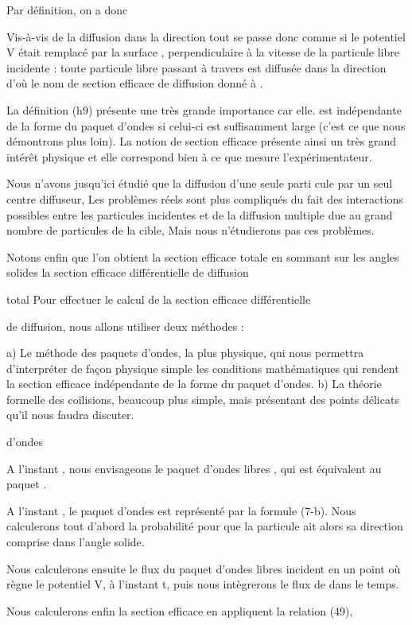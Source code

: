 Par définition, on a donc

Vis-à-vis de la diffusion dans la direction  tout se passe donc comme
si le potentiel V était remplacé par la surface , perpendiculaire
à la vitesse de la particule libre incidente : toute particule libre passant à
travers  est diffusée dans la direction  d'où le nom de
section efficace de diffusion donné à .

La définition (h9) présente une très grande importance car elle.
est indépendante de la forme du paquet d'ondes si celui-ci est suffisamment large
(c'est ce que nous démontrons plus loin). La notion de section
efficace présente ainsi un très grand intérêt physique et elle correspond
bien à ce que mesure l'expérimentateur.

Nous n'avons jusqu'ici étudié que la diffusion d'une seule parti
cule par un seul centre diffuseur, Les problèmes réels sont plus compliqués
du fait des interactions possibles entre les particules incidentes et de
la diffusion multiple due au grand nombre de particules de la cible, Mais
nous n'étudierons pas ces problèmes.

Notons enfin que l'on obtient la section efficace totale en sommant sur les angles
solides la section efficace différentielle de diffusion

total
Pour effectuer le calcul de la section efficace différentielle

de diffusion, nous allons utiliser deux méthodes :


a) Le méthode des paquets d'ondes, la plus physique, qui nous permettra
d'interpréter de façon physique simple les conditions mathématiques qui
rendent la section efficace indépendante de la forme du paquet d'ondes.
b) La théorie formelle des coïlisions, beaucoup plus simple, mais présentant des
points délicats qu'il nous faudra discuter.

d'ondes

A l'instant  , nous envisageons le paquet d'ondes libres , qui est équivalent au paquet .

A l'instant  , le paquet d'ondes est représenté par la
formule (7-b). Nous calculerons tout d'abord la probabilité 
pour que la particule ait alors sa direction comprise dans l'angle solide.

Nous calculerons ensuite le flux du paquet d'ondes libres incident en un point où
règne le potentiel V, à l'instant t, puis nous intègrerons le flux de  dans le temps.

Nous calculerons enfin la section efficace en appliquent la relation (49),

